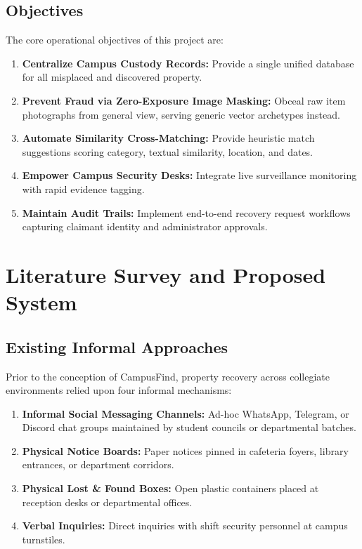 \documentclass[11pt,a4paper]{article}
\begin{document}
\subsection{Objectives}
The core operational objectives of this project are:
\begin{enumerate}
    \item \textbf{Centralize Campus Custody Records:} Provide a single unified database for all misplaced and discovered property.
    \item \textbf{Prevent Fraud via Zero-Exposure Image Masking:} Obceal raw item photographs from general view, serving generic vector archetypes instead.
    \item \textbf{Automate Similarity Cross-Matching:} Provide heuristic match suggestions scoring category, textual similarity, location, and dates.
    \item \textbf{Empower Campus Security Desks:} Integrate live surveillance monitoring with rapid evidence tagging.
    \item \textbf{Maintain Audit Trails:} Implement end-to-end recovery request workflows capturing claimant identity and administrator approvals.
\end{enumerate}

\newpage

\section{Literature Survey and Proposed System}

\subsection{Existing Informal Approaches}
Prior to the conception of CampusFind, property recovery across collegiate environments relied upon four informal mechanisms:
\begin{enumerate}
    \item \textbf{Informal Social Messaging Channels:} Ad-hoc WhatsApp, Telegram, or Discord chat groups maintained by student councils or departmental batches.
    \item \textbf{Physical Notice Boards:} Paper notices pinned in cafeteria foyers, library entrances, or department corridors.
    \item \textbf{Physical Lost \& Found Boxes:} Open plastic containers placed at reception desks or departmental offices.
    \item \textbf{Verbal Inquiries:} Direct inquiries with shift security personnel at campus turnstiles.
\end{enumerate}
\end{document}
